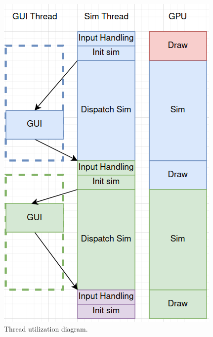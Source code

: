 \begin{figure}[ht]
    \centering
    \centerline{\includegraphics[width=0.5\linewidth]{Ch42Design/figures/threading_usage_2.png}}
    \caption{Thread utilization diagram.}
    \label{fig:CurrentSwimlane}
\end{figure}
